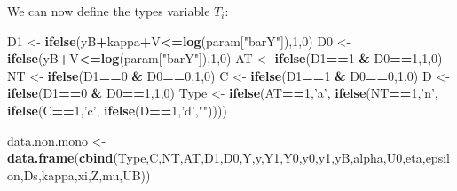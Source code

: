 \documentclass[]{book}
\newenvironment{Shaded}{\begin{snugshade}}{\end{snugshade}}
\newcommand{\DecValTok}[1]{\textcolor[rgb]{0.00,0.00,0.81}{#1}}
\newcommand{\KeywordTok}[1]{\textcolor[rgb]{0.13,0.29,0.53}{\textbf{#1}}}
\newcommand{\NormalTok}[1]{#1}
\newcommand{\OperatorTok}[1]{\textcolor[rgb]{0.81,0.36,0.00}{\textbf{#1}}}
\newcommand{\StringTok}[1]{\textcolor[rgb]{0.31,0.60,0.02}{#1}}
\theoremstyle{definition}
\theoremstyle{definition}
\theoremstyle{definition}
\theoremstyle{remark}
\begin{document}
We can now define the types variable \(T_i\):

\begin{Shaded}
\begin{Highlighting}[]
\NormalTok{D1 <-}\StringTok{ }\KeywordTok{ifelse}\NormalTok{(yB}\OperatorTok{+}\NormalTok{kappa}\OperatorTok{+}\NormalTok{V}\OperatorTok{<=}\KeywordTok{log}\NormalTok{(param[}\StringTok{"barY"}\NormalTok{]),}\DecValTok{1}\NormalTok{,}\DecValTok{0}\NormalTok{)}
\NormalTok{D0 <-}\StringTok{ }\KeywordTok{ifelse}\NormalTok{(yB}\OperatorTok{+}\NormalTok{V}\OperatorTok{<=}\KeywordTok{log}\NormalTok{(param[}\StringTok{"barY"}\NormalTok{]),}\DecValTok{1}\NormalTok{,}\DecValTok{0}\NormalTok{)}
\NormalTok{AT <-}\StringTok{ }\KeywordTok{ifelse}\NormalTok{(D1}\OperatorTok{==}\DecValTok{1} \OperatorTok{&}\StringTok{ }\NormalTok{D0}\OperatorTok{==}\DecValTok{1}\NormalTok{,}\DecValTok{1}\NormalTok{,}\DecValTok{0}\NormalTok{)}
\NormalTok{NT <-}\StringTok{ }\KeywordTok{ifelse}\NormalTok{(D1}\OperatorTok{==}\DecValTok{0} \OperatorTok{&}\StringTok{ }\NormalTok{D0}\OperatorTok{==}\DecValTok{0}\NormalTok{,}\DecValTok{1}\NormalTok{,}\DecValTok{0}\NormalTok{)}
\NormalTok{C <-}\StringTok{ }\KeywordTok{ifelse}\NormalTok{(D1}\OperatorTok{==}\DecValTok{1} \OperatorTok{&}\StringTok{ }\NormalTok{D0}\OperatorTok{==}\DecValTok{0}\NormalTok{,}\DecValTok{1}\NormalTok{,}\DecValTok{0}\NormalTok{)}
\NormalTok{D <-}\StringTok{ }\KeywordTok{ifelse}\NormalTok{(D1}\OperatorTok{==}\DecValTok{0} \OperatorTok{&}\StringTok{ }\NormalTok{D0}\OperatorTok{==}\DecValTok{1}\NormalTok{,}\DecValTok{1}\NormalTok{,}\DecValTok{0}\NormalTok{)}
\NormalTok{Type <-}\StringTok{ }\KeywordTok{ifelse}\NormalTok{(AT}\OperatorTok{==}\DecValTok{1}\NormalTok{,}\StringTok{'a'}\NormalTok{,}
            \KeywordTok{ifelse}\NormalTok{(NT}\OperatorTok{==}\DecValTok{1}\NormalTok{,}\StringTok{'n'}\NormalTok{,}
                   \KeywordTok{ifelse}\NormalTok{(C}\OperatorTok{==}\DecValTok{1}\NormalTok{,}\StringTok{'c'}\NormalTok{,}
                          \KeywordTok{ifelse}\NormalTok{(D}\OperatorTok{==}\DecValTok{1}\NormalTok{,}\StringTok{'d'}\NormalTok{,}\StringTok{""}\NormalTok{))))}

\NormalTok{data.non.mono <-}\StringTok{ }\KeywordTok{data.frame}\NormalTok{(}\KeywordTok{cbind}\NormalTok{(Type,C,NT,AT,D1,D0,Y,y,Y1,Y0,y0,y1,yB,alpha,U0,eta,epsilon,Ds,kappa,xi,Z,mu,UB))}
\end{Highlighting}
\end{Shaded}
\end{document}

